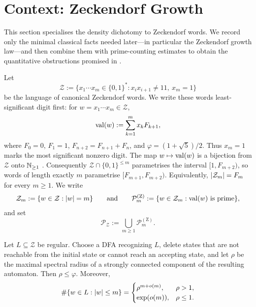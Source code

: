 \section{Context: Zeckendorf Growth}
\label{sec:zeckendorf}

This section specialises the density dichotomy to Zeckendorf words. We
record only the minimal classical facts needed later---in particular the
Zeckendorf growth law---and then combine them with prime-counting
estimates to obtain the quantitative obstructions promised in
.

Let
\[
  \mathcal Z
  :=\{x_1\cdots x_m\in\{0,1\}^\ast:
      x_ix_{i+1}\neq 11,\ x_m=1\}
\]
be the language of canonical Zeckendorf words. We write these words
least-significant digit first: for \(w=x_1\cdots x_m\in\mathcal Z\),
\[
  \operatorname{val}(w):=\sum_{k=1}^m x_kF_{k+1},
\]
where \(F_0=0\), \(F_1=1\), \(F_{n+2}=F_{n+1}+F_n\), and
\(\varphi=(1+\sqrt5)/2\). Thus \(x_m=1\) marks the most significant
nonzero digit. The map \(w\mapsto\operatorname{val}(w)\) is a bijection from
\(\mathcal Z\) onto \(\mathbb{N}_{\ge 1}\) \cite{Zeckendorf1972}.
Consequently \(\mathcal Z\cap\{0,1\}^{\le m}\) parametrises the
interval \([1,F_{m+2})\), so words of length exactly \(m\) parametrise
\([F_{m+1},F_{m+2})\). Equivalently,
\(\lvert \mathcal Z_m \rvert=F_m\) for every \(m\ge 1\).
We write
\[
  \mathcal Z_m:=\{w\in\mathcal Z:\lvert w \rvert=m\}
  \qquad\text{and}\qquad
  \mathcal P_m^{(\mathrm Z)}
  :=\{w\in\mathcal Z_m:\operatorname{val}(w)\text{ is prime}\},
\]
and set
\[
  \mathcal P_{\mathcal Z}
  :=\bigcup_{m\ge 1}\mathcal P_m^{(\mathrm Z)}.
\]

\begin{lemma}
  \label{lem:zeckendorf-length-growth}
  Let \(L\subseteq\mathcal Z\) be regular. Choose a DFA recognizing
  \(L\), delete states that are not reachable from the initial state or
  cannot reach an accepting state, and let \(\rho\) be the maximal
  spectral radius of a strongly connected component of the resulting
  automaton. Then \(\rho\le\varphi\). Moreover,
  \[
    \#\{w\in L:\lvert w \rvert\le m\}=
    \begin{cases}
      \rho^{m+o(m)}, & \rho>1,\\
      \exp(o(m)), & \rho\le1.
    \end{cases}
  \]
\end{lemma}

